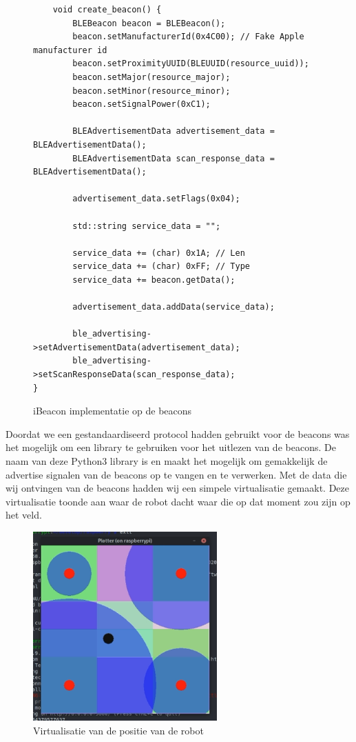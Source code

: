 \begin{figure}[H]
    \centering
    \begin{verbatim}
    void create_beacon() {
        BLEBeacon beacon = BLEBeacon();
        beacon.setManufacturerId(0x4C00); // Fake Apple manufacturer id
        beacon.setProximityUUID(BLEUUID(resource_uuid));
        beacon.setMajor(resource_major);
        beacon.setMinor(resource_minor);
        beacon.setSignalPower(0xC1);
        
        BLEAdvertisementData advertisement_data = BLEAdvertisementData();
        BLEAdvertisementData scan_response_data = BLEAdvertisementData();
        
        advertisement_data.setFlags(0x04);
        
        std::string service_data = "";
        
        service_data += (char) 0x1A; // Len
        service_data += (char) 0xFF; // Type
        service_data += beacon.getData();
        
        advertisement_data.addData(service_data);
        
        ble_advertising->setAdvertisementData(advertisement_data);
        ble_advertising->setScanResponseData(scan_response_data);
}
    \end{verbatim}
    \caption{iBeacon implementatie op de beacons}
    \label{fig:beacon_code}
\end{figure}

Doordat we een gestandaardiseerd protocol hadden gebruikt voor de beacons was het mogelijk om een library te gebruiken voor het uitlezen van de beacons. De naam van deze Python3 library is  \cite{beacontools} en maakt het mogelijk om gemakkelijk de advertise signalen van de beacons op te vangen en te verwerken. Met de data die wij ontvingen van de beacons hadden wij een simpele virtualisatie gemaakt. Deze virtualisatie toonde aan waar de robot dacht waar die op dat moment zou zijn op het veld. \\
\begin{figure}[H]
    \centering
    \includegraphics[width=200pt]{img/plotter.png}
    \caption{Virtualisatie van de positie van de robot}
    \label{fig:plotter}
\end{figure}

